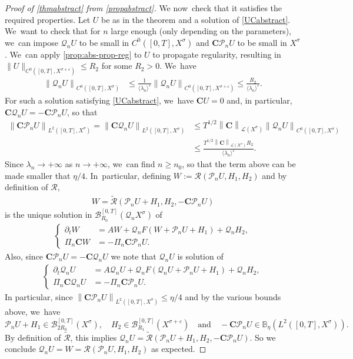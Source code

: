 \documentclass[JEP,XML,SOM,Unicode,published]{cedram}
\newcommand{\quand}{\quad\text{and}\quad}
\theoremstyle{definition}
\let\mc\mathcal
\let\veps\varepsilon
\newcommand{\B}{\mc{B}}
\newcommand{\Q}{\mathcal{Q}}
\renewcommand{\P}{\mathcal{P}}
\newcommand{\bC}{\boldsymbol{C}}
\providecommand{\norm}[1]{\lVert#1\rVert}
\providecommand{\inn}[1]{\langle#1\rangle}
\newcommand\nor[2]{\left\|#1\right\|_{#2}}
\begin{document}
\begin{proof}[Proof of \cref{thmabstract} from \cref{propabstract}]
We now~check that it satisfies the required properties. Let $U$ be as in the theorem and a solution of \eqref{UCabstract}. We~want to check that for $n$ large enough (only depending on the parameters), we~can impose $\Q_n U$ to be small in $C^{0}([0,T],X^{\sigma})$ and $\bC \P_n U$ to be small in $X^{\sigma}$. We~can apply \cref{prop:abs-prop-reg} to $U$ to propagate regularity, resulting in $\norm{U}_{C^0([0, T], X^{\sigma+\veps})}\leq R_{2}$ for some $R_{2}>0$. We~have
\begin{align}
\label{unifboundU}
\nor{ \Q_n U}{C^{0}([0,T],X^{\sigma})} &\leq \frac{1}{\inn{\lambda_n}^{\veps}} \nor{ \Q_n U}{C^{0}([0,T],X^{\sigma+\veps})}\leq \frac{R_{2}}{\inn{\lambda_n}^{\veps}} .
\end{align}
For such a solution satisfying \eqref{UCabstract}, we~have $\bC U=0$ and, in particular, $\bC \Q_n U=-\bC \P_n U$, so that
\begin{align*}
\nor{\bC \P_n U}{L^{2}([0,T],X^{\sigma})}=\nor{\bC \Q_n U}{L^{2}([0,T],X^{\sigma})}&\leq T^{1/2}\nor{\bC}{\mc{L}(X^\sigma)}\nor{ \Q_n U}{C^{0}([0,T],X^{\sigma})}\\
&\leq \frac{T^{1/2}\nor{\bC}{\mc{L}(X^\sigma)}R_{2}}{\inn{\lambda_n}^{\veps}} .
\end{align*}
Since $\lambda_n\to +\infty$ as $n\to +\infty$, we~can find $n\geq n_0$, so that the term above can be made smaller that $\eta/4$. In~particular, defining $W:= \mathcal{R}(\P_{n}U,H_{1},H_{2})$ and by definition of $\mathcal{R}$,
\begin{align*}
W= \mathcal{\widetilde{R}}(\P_{n}U+H_{1},H_{2},- \bC \P_{n}U)
\end{align*}
is the unique solution in $\B_{R_{0}}^{[0,T]}(\Q_n X^{\sigma})$ of
\begin{align*}
\left\{\begin{array}{rl}
\partial_t W&=AW+\Q_n F(W+\P_{n}U+H_{1})+\Q_{n}H_{2}, \\[3pt]
\Pi_n\bC W &=-\Pi_n \bC \P_{n}U.
\end{array}\right.
\end{align*}
Also, since $\bC \P_{n}U=- \bC \Q_{n}U $ we note that $\Q_n U$ is solution of
\begin{align*}
\left\{\begin{array}{rl}
\partial_t \Q_n U&=A\Q_n U+\Q_n F(\Q_n U+\P_n U+H_{1})+\Q_{n}H_{2}, \\[3pt]
\Pi_n\bC \Q_n U &=-\Pi_n \bC \P_{n}U.
\end{array}\right.
\end{align*}
In particular, since $ \nor{\bC \P_n U}{L^{2}([0,T],X^{\sigma})}\leq \eta/4$ and by the various bounds above, we~have
\[
\P_n U+H_{1}\in \B_{2R_{0}}^{[0,T]}(X^{\sigma}),\quad H_{2}\in \B_{R_{1}}^{[0,T]}(X^{\sigma+\veps})\quand-\bC \P_{n}U\in \mathbb{B}_{\eta}(L^2([0, T], X^{\sigma})).
\]
By definition of $\mathcal{\widetilde{R}}$, this implies $\Q_n U= \mathcal{\widetilde{R}}(\P_n U+H_{1},H_{2},- \bC \P_{n}U)$. So we conclude $\Q_{n}U=W=\mathcal{R}(\P_{n}U,H_{1},H_{2})$ as expected.


\end{proof}
\end{document}
